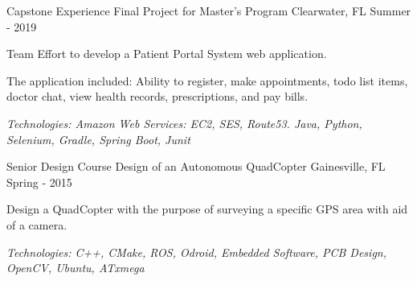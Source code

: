 

\begin{cventries}

	\cventry
		{Capstone Experience} %
		{Final Project for Master's Program} %
		{Clearwater, FL} %
		{Summer - 2019} %
		{
			\begin{cvitems} %
			\item {Team Effort to develop a Patient Portal System web application.}
			\item {The application included: Ability to register, make appointments, todo list items, doctor chat, view health records, prescriptions, and pay bills.}
      \item {\it{Technologies:} Amazon Web Services: EC2, SES, Route53. Java, Python, Selenium, Gradle, Spring Boot, Junit}
			\end{cvitems}
		}

  \cventry
    {Senior Design Course} %
    {Design of an Autonomous QuadCopter} %
    {Gainesville, FL} %
    {Spring - 2015} %
    {
      \begin{cvitems} %
				\item {Design a QuadCopter with the purpose of surveying a specific GPS area with aid of a camera.}
				\item {\it{Technologies:} C++, CMake, ROS, Odroid, Embedded Software, PCB Design, OpenCV, Ubuntu, ATxmega}
      \end{cvitems}
    }



\end{cventries}
